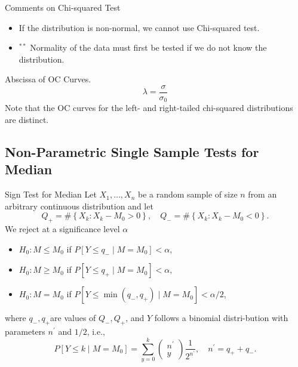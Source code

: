 \documentclass{beamer}
\begin{document}
\begin{frame}{Comments on Chi-squared Test}
\begin{itemize}
\item If the distribution is non-normal, we cannot use Chi-squared test.
\item ${ }^{* *}$ Normality of the data must first be tested if we do not know the distribution.
\end{itemize}
Abscissa of OC Curves.
$$
\lambda=\frac{\sigma}{\sigma_{0}}
$$
Note that the OC curves for the left- and right-tailed chi-squared distributions are distinct.
\end{frame}

\subsection{Non-Parametric Single Sample Tests for Median}
\begin{frame}{Sign Test for Median}
Let $X_{1}, \ldots, X_{n}$ be a random sample of size $n$ from an arbitrary continuous distribution and let
$$
Q_{+}=\#\left\{X_{k}: X_{k}-M_{0}>0\right\}, \quad Q_{-}=\#\left\{X_{k}: X_{k}-M_{0}<0\right\} .
$$
We reject at a significance level $\alpha$
\begin{itemize}
\item $H_{0}: M \leq M_{0}$ if $P\left[Y \leq q_{-} \mid M=M_{0}\right]<\alpha$,
\item $H_{0}: M \geq M_{0}$ if $P\left[Y \leq q_{+} \mid M=M_{0}\right]<\alpha$,
\item $H_{0}: M=M_{0}$ if $P\left[Y \leq \min \left(q_{-}, q_{+}\right) \mid M=M_{0}\right]<\alpha / 2$,
\end{itemize}
where $q_{-}, q_{+}$are values of $Q_{-}, Q_{+}$, and $Y$ follows a binomial distri-bution with parameters $n^{\prime}$ and $1 / 2$, i.e.,
$$
P\left[Y \leq k \mid M=M_{0}\right]=\sum_{y=0}^{k}\left(\begin{array}{c}
n^{\prime} \\
y
\end{array}\right) \frac{1}{2^{n^{\prime}}}, \quad n^{\prime}=q_{+}+q_{-} .
$$
\end{frame}
\end{document}
